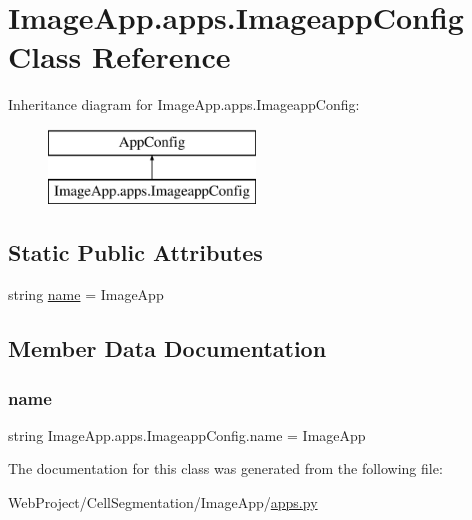 \hypertarget{class_image_app_1_1apps_1_1_imageapp_config}{}\section{Image\+App.\+apps.\+Imageapp\+Config Class Reference}
\label{class_image_app_1_1apps_1_1_imageapp_config}
Inheritance diagram for Image\+App.\+apps.\+Imageapp\+Config\+:\begin{figure}[H]
\begin{center}
\leavevmode
\includegraphics[height=2.000000cm]{class_image_app_1_1apps_1_1_imageapp_config}
\end{center}
\end{figure}
\subsection*{Static Public Attributes}
\begin{DoxyCompactItemize}
\item 
string \mbox{\hyperlink{class_image_app_1_1apps_1_1_imageapp_config_aee520d86c18e29442022b02d9f2646d3}{name}} = \textquotesingle{}Image\+App\textquotesingle{}
\end{DoxyCompactItemize}


\subsection{Member Data Documentation}
\mbox{\label{class_image_app_1_1apps_1_1_imageapp_config_aee520d86c18e29442022b02d9f2646d3}} 
\subsubsection{\texorpdfstring{name}{name}}
{\footnotesize\ttfamily string Image\+App.\+apps.\+Imageapp\+Config.\+name = \textquotesingle{}Image\+App\textquotesingle{}\hspace{0.3cm}{\ttfamily [static]}}



The documentation for this class was generated from the following file\+:\begin{DoxyCompactItemize}
\item 
Web\+Project/\+Cell\+Segmentation/\+Image\+App/\mbox{\hyperlink{apps_8py}{apps.\+py}}\end{DoxyCompactItemize}
